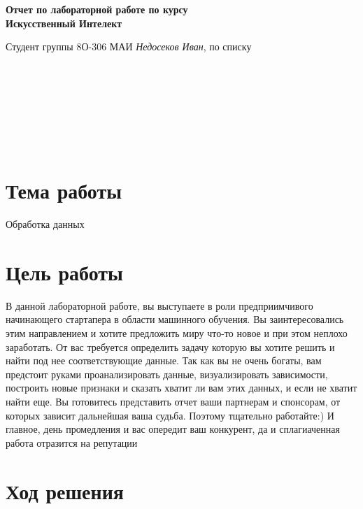 \documentclass[12pt]{article}
\begin{document}
\begin{center}
	\Large{\textbf{Отчет по лабораторной работе  
		по курсу \\ \guillemotleft Искусственный Интелект\guillemotright}}
	
\end{center}
\begin{flushright}

Студент группы 8О-306 МАИ \textit{Недосеков Иван},  по списку \\
 \\
 \\
\ \\
 \\
 \\
 \\
 \\

\end{flushright}

\section{Тема работы}
Обработка данных

\section{Цель работы}
В данной лабораторной работе, вы выступаете в роли предприимчивого начинающего стартапера в области машинного обучения. Вы заинтересовались этим направлением и хотите предложить миру что-то новое и при этом неплохо заработать. От вас требуется определить задачу которую вы хотите решить и найти под нее соответствующие данные. Так как вы не очень богаты, вам предстоит руками проанализировать данные, визуализировать зависимости, построить новые признаки и сказать хватит ли вам этих данных, и если не хватит найти еще. Вы готовитесь представить отчет ваши партнерам и спонсорам, от которых зависит дальнейшая ваша судьба. Поэтому тщательно работайте:) И главное, день промедления и вас опередит ваш конкурент, да и сплагиаченная работа отразится на репутации


\section{Ход решения}
\end{document}
